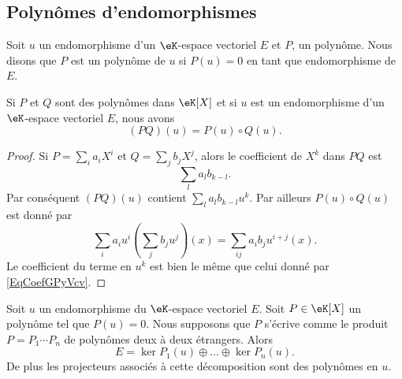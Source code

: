 \subsection{Polynômes d'endomorphismes}

Soit \( u\) un endomorphisme d'un \( \eK\)-espace vectoriel \( E\) et \( P\), un polynôme. Nous disons que \( P\) est un polynôme  de \( u\) si \( P(u)=0\) en tant que endomorphisme de \( E\).

\begin{lemma}       \label{LemQWvhYb}
    Si \( P\) et \( Q\) sont des polynômes dans \( \eK[X]\) et si \( u\) est un endomorphisme d'un \( \eK\)-espace vectoriel \( E\), nous avons
    \begin{equation}
        (PQ)(u)=P(u)\circ Q(u).
    \end{equation}
\end{lemma}

\begin{proof}
    Si \( P=\sum_i a_iX^i\) et \( Q=\sum_j b_jX^j\), alors le coefficient de \( X^k\) dans \( PQ\) est
    \begin{equation}        \label{EqCoefGPyVcv}
        \sum_la_lb_{k-l}.
    \end{equation}
    Par conséquent \( (PQ)(u)\) contient \( \sum_la_lb_{k-l}u^k\). Par ailleurs \( P(u)\circ Q(u)\) est donné par
    \begin{equation}
        \sum_ia_iu^i\left( \sum_jb_ju^j \right)(x)=\sum_{ij}a_ib_ju^{i+j}(x).
    \end{equation}
    Le coefficient du terme en \( u^k\) est bien le même que celui donné par \eqref{EqCoefGPyVcv}.
\end{proof}

\begin{theorem}       \label{ThoDecompNoyayzzMWod}
    Soit \( u\) un endomorphisme du \( \eK\)-espace vectoriel \( E\). Soit \( P\in\eK[X]\) un polynôme tel que \( P(u)=0\). Nous supposons que \( P\) s'écrive comme le produit \( P=P_1\cdots P_n\) de polynômes deux à deux étrangers. Alors
    \begin{equation}
        E=\ker P_1(u)\oplus\ldots\oplus\ker P_n(u).
    \end{equation}
    De plus les projecteurs associés à cette décomposition sont des polynômes en \( u\).
\end{theorem}

